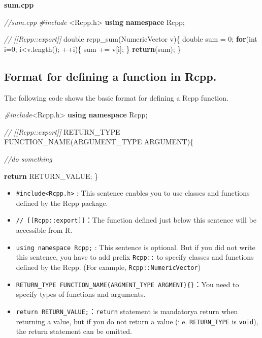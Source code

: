 \documentclass[]{book}
\newenvironment{Shaded}{\begin{snugshade}}{\end{snugshade}}
\newcommand{\CommentTok}[1]{\textcolor[rgb]{0.56,0.35,0.01}{\textit{#1}}}
\newcommand{\ControlFlowTok}[1]{\textcolor[rgb]{0.13,0.29,0.53}{\textbf{#1}}}
\newcommand{\DataTypeTok}[1]{\textcolor[rgb]{0.13,0.29,0.53}{#1}}
\newcommand{\DecValTok}[1]{\textcolor[rgb]{0.00,0.00,0.81}{#1}}
\newcommand{\ImportTok}[1]{#1}
\newcommand{\KeywordTok}[1]{\textcolor[rgb]{0.13,0.29,0.53}{\textbf{#1}}}
\newcommand{\NormalTok}[1]{#1}
\newcommand{\PreprocessorTok}[1]{\textcolor[rgb]{0.56,0.35,0.01}{\textit{#1}}}
\begin{document}
\textbf{sum.cpp}

\begin{Shaded}
\begin{Highlighting}[]
\CommentTok{//sum.cpp}
\PreprocessorTok{#include }\ImportTok{<Rcpp.h>}
\KeywordTok{using} \KeywordTok{namespace}\NormalTok{ Rcpp;}

\CommentTok{// [[Rcpp::export]]}
\DataTypeTok{double}\NormalTok{ rcpp_sum(NumericVector v)\{}
    \DataTypeTok{double}\NormalTok{ sum = }\DecValTok{0}\NormalTok{;}
    \ControlFlowTok{for}\NormalTok{(}\DataTypeTok{int}\NormalTok{ i=}\DecValTok{0}\NormalTok{; i<v.length(); ++i)\{}
\NormalTok{        sum += v[i];}
\NormalTok{    \}}
    \ControlFlowTok{return}\NormalTok{(sum);}
\NormalTok{\}}
\end{Highlighting}
\end{Shaded}

\hypertarget{format-for-defining-a-function-in-rcpp.}{%
\subsection{Format for defining a function in Rcpp.}\label{format-for-defining-a-function-in-rcpp.}}

The following code shows the basic format for defining a Rcpp function.

\begin{Shaded}
\begin{Highlighting}[]
\PreprocessorTok{#include}\ImportTok{<Rcpp.h>}
\KeywordTok{using} \KeywordTok{namespace}\NormalTok{ Rcpp;}

\CommentTok{// [[Rcpp::export]]}
\NormalTok{RETURN_TYPE FUNCTION_NAME(ARGUMENT_TYPE ARGUMENT)\{}

    \CommentTok{//do something}

    \ControlFlowTok{return}\NormalTok{ RETURN_VALUE;}
\NormalTok{\}}
\end{Highlighting}
\end{Shaded}

\begin{itemize}
\item
  \texttt{\#include\textless{}Rcpp.h\textgreater{}} : This sentence enables you to use classes and functions defined by the Rcpp package.
\item
  \texttt{//\ {[}{[}Rcpp::export{]}{]}}：The function defined just below this sentence will be accessible from R.
\item
  \texttt{using\ namespace\ Rcpp;} : This sentence is optional. But if you did not write this sentence, you have to add prefix \texttt{Rcpp::} to specify classes and functions defined by the Rcpp. (For example, \texttt{Rcpp::NumericVector})
\item
  \texttt{RETURN\_TYPE\ FUNCTION\_NAME(ARGMENT\_TYPE\ ARGMENT)\{\}}：You need to specify types of functions and arguments.
\item
  \texttt{return\ RETURN\_VALUE;}：\texttt{return} statement is mandatorya return when returning a value, but if you do not return a value (i.e. \texttt{RETURN\_TYPE} is \texttt{void}), the return statement can be omitted.
\end{itemize}
\end{document}
